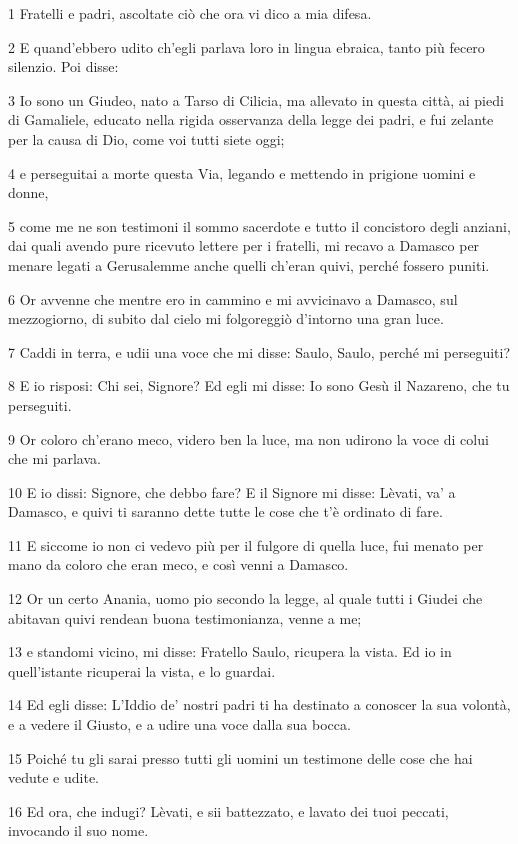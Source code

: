 \par 1 Fratelli e padri, ascoltate ciò che ora vi dico a mia difesa.
\par 2 E quand'ebbero udito ch'egli parlava loro in lingua ebraica, tanto più fecero silenzio. Poi disse:
\par 3 Io sono un Giudeo, nato a Tarso di Cilicia, ma allevato in questa città, ai piedi di Gamaliele, educato nella rigida osservanza della legge dei padri, e fui zelante per la causa di Dio, come voi tutti siete oggi;
\par 4 e perseguitai a morte questa Via, legando e mettendo in prigione uomini e donne,
\par 5 come me ne son testimoni il sommo sacerdote e tutto il concistoro degli anziani, dai quali avendo pure ricevuto lettere per i fratelli, mi recavo a Damasco per menare legati a Gerusalemme anche quelli ch'eran quivi, perché fossero puniti.
\par 6 Or avvenne che mentre ero in cammino e mi avvicinavo a Damasco, sul mezzogiorno, di subito dal cielo mi folgoreggiò d'intorno una gran luce.
\par 7 Caddi in terra, e udii una voce che mi disse: Saulo, Saulo, perché mi perseguiti?
\par 8 E io risposi: Chi sei, Signore? Ed egli mi disse: Io sono Gesù il Nazareno, che tu perseguiti.
\par 9 Or coloro ch'erano meco, videro ben la luce, ma non udirono la voce di colui che mi parlava.
\par 10 E io dissi: Signore, che debbo fare? E il Signore mi disse: Lèvati, va' a Damasco, e quivi ti saranno dette tutte le cose che t'è ordinato di fare.
\par 11 E siccome io non ci vedevo più per il fulgore di quella luce, fui menato per mano da coloro che eran meco, e così venni a Damasco.
\par 12 Or un certo Anania, uomo pio secondo la legge, al quale tutti i Giudei che abitavan quivi rendean buona testimonianza, venne a me;
\par 13 e standomi vicino, mi disse: Fratello Saulo, ricupera la vista. Ed io in quell'istante ricuperai la vista, e lo guardai.
\par 14 Ed egli disse: L'Iddio de' nostri padri ti ha destinato a conoscer la sua volontà, e a vedere il Giusto, e a udire una voce dalla sua bocca.
\par 15 Poiché tu gli sarai presso tutti gli uomini un testimone delle cose che hai vedute e udite.
\par 16 Ed ora, che indugi? Lèvati, e sii battezzato, e lavato dei tuoi peccati, invocando il suo nome.
